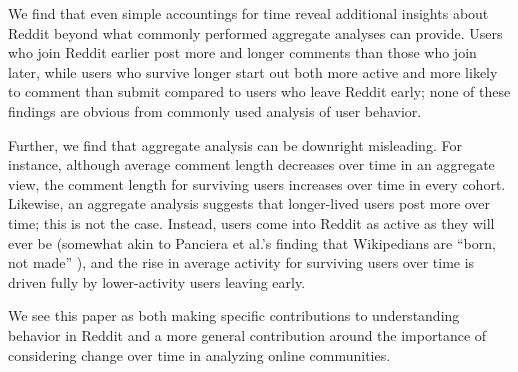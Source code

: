We find that even simple accountings for time reveal additional insights about Reddit beyond what commonly performed aggregate analyses can provide.  Users who join Reddit earlier post more and longer comments than those who join later, while users who survive longer start out both more active and more likely to comment than submit compared to users who leave Reddit early; none of these findings are obvious from commonly used analysis of user behavior.  

Further, we find that aggregate analysis can be downright misleading.  For instance, although average comment length decreases over time in an aggregate view, the comment length for surviving users increases over time in every cohort.  Likewise, an aggregate analysis suggests that longer-lived users post more over time; this is not the case.  Instead, users come into Reddit as active as they will ever be (somewhat akin to Panciera et al.'s finding that Wikipedians are ``born, not made'' \cite{Panciera2009}), and the rise in average activity for surviving users over time is driven fully by lower-activity users leaving early.

We see this paper as both making specific contributions to understanding behavior in Reddit and a more general contribution around the importance of considering change over time in analyzing online communities. 
